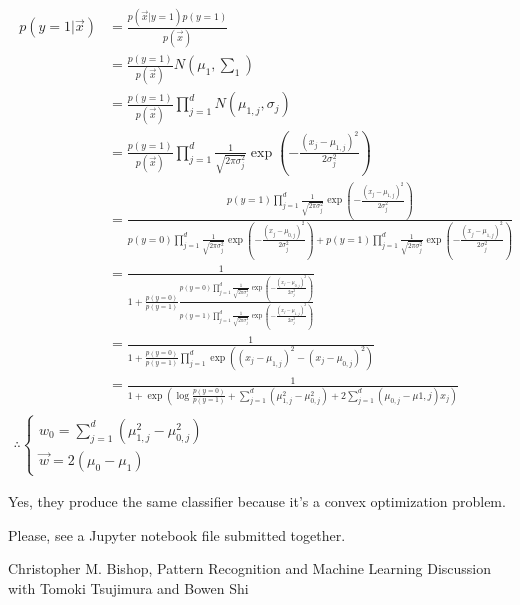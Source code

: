 \documentclass{introtosml}
\newcommand{\x}{\vec{x}}
\newcommand{\w}{\vec{w}}
\newcommand\gauss[1]{\prod_{j=1}^d \frac{1}{\sqrt{2 \pi \sigma_j^2}} \exp(- \frac{(x_j - \mu_{#1,j})^2}{2 \sigma_j^2})}
\newcommand\cgauss[1]{p(y=#1)\gauss{#1}}
\newcommand\pbias{\frac{p(y=0)}{p(y=1)}}
\begin{document}
\maketitle

\begin{p}
  \item
    \begin{gather}
      \begin{aligned}
        p(y=1|\x)
        & = \frac{p(\x|y=1)p(y=1)}{p(\x)} \\
        & = \frac{p(y=1)}{p(\x)} N(\mu_1, \sum_1) \\
        & = \frac{p(y=1)}{p(\x)} \prod_{j=1}^d N(\mu_{1,j}, \sigma_j) \\
        & = \frac{p(y=1)}{p(\x)} \gauss{1} \\
        & = \frac{\cgauss{1}}{\cgauss{0} + \cgauss{1}} \\
        & = \frac{1}{1 + \pbias \frac{\cgauss{0}}{\cgauss{1}}} \\
        & = \frac{1}{1 + \pbias \prod_{j=1}^d \exp((x_j - \mu_{1,j})^2 - (x_j - \mu_{0,j})^2)} \\
        & = \frac{1}{1 +
            \exp(\log \pbias + \sum_{j=1}^d (\mu_{1,j}^2 - \mu_{0,j}^2)
                + 2 \sum_{j=1}^d (\mu_{0,j} - \mu{1,j}) x_j)}
      \end{aligned} \\
      \therefore \begin{cases}
        w_0 = \sum_{j=1}^d (\mu_{1,j}^2 - \mu_{0,j}^2) \\
        \w = 2 (\mu_0 - \mu_1)
      \end{cases}
    \end{gather}

  \item
    Yes, they produce the same classifier because it's a convex optimization problem.

  \item
    Please, see a Jupyter notebook file submitted together.
\end{p}

\begin{thebibliography}{9}
   Christopher M. Bishop, Pattern Recognition and Machine Learning
   Discussion with Tomoki Tsujimura and Bowen Shi
\end{thebibliography}
\end{document}
